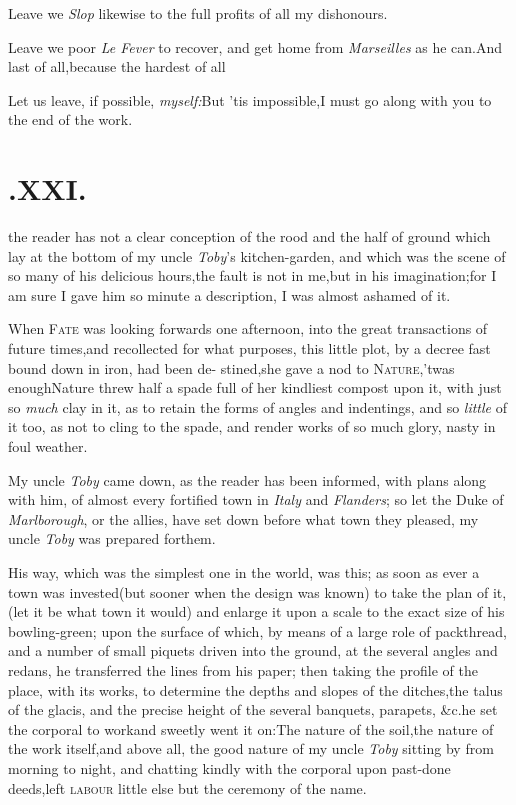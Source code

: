 \documentclass{article}
\begin{document}
Leave we \textit{Slop} likewise to the full pro\-fits of all my
dishonours.\tsh

Leave we poor \textit{Le Fever} to recover, and get home from
\textit{Marseilles} as he can.\break\tsh And last of
all,\tsk because the hardest of all\tsh{}

Let us leave, if possible, \textit{myself:}\tsh But
’tis impossible,\tsk I must go along with you to the end of
the work.

\section{.\enspace XXI.}

 the reader has not a clear
conception of the rood and the half of ground which lay at the
bottom of my uncle \textit{Toby}’s kitchen-garden, and which
was the scene of so many of his delicious hours,\tsk the fault is
not in me,\tsk but in his imagination;\tsk for I am sure I gave
him so minute a description, I was almost ashamed of it.

When \textsc{Fate} was looking forwards one afternoon,
into the great transactions of future times,\tsk and recollected
for what purposes, this little plot, by a decree fast bound down in
iron, had been de- stined,\tsk she gave a nod to
\textsc{Nature},\tsk ’twas enough\tsk Nature threw
half a spade full of her kindliest compost upon it, with just so
\textit{much} clay in it, as to retain the forms of angles and
indentings,\tsk\break
and so \textit{little} of it too, as not to cling
to the spade, and render works of so much glory, nasty in foul
weather.

My uncle \textit{Toby} came down, as the reader has been informed,
with plans along with him, of almost every fortified town in
\textit{Italy} and \textit{Flanders}; so let the Duke of
\textit{Marlborough}, or the allies, have set down before what town
they pleased, my uncle \textit{Toby} was prepared for\break them.

His way, which was the simplest one in the world, was this; as
soon as ever a town was invested\tsk (but sooner when 
the design was known) to take the plan\break
of it, (let it be what town it would)\break
and enlarge it upon a scale to the exact size of his bowling-green;
upon the surface of which, by means of a large role of packthread,
and a number of small piquets driven into the ground, at the
several angles and redans, he transferred the lines from his paper;
then taking the profile of the place, with its works, to determine
the depths and slopes of the ditches,\tsk the talus of the
glacis, and the precise height of the several banquets, parapets,
\&c.\tsk he set the corporal to work\tsh and sweetly went it
on:\tsh The nature of the soil,\tsk the nature of the
work itself,\tsk and above all, the good nature of my uncle
\textit{Toby} sitting by from morning to night, and chatting kindly
with the corporal upon past-done deeds,\tsk left
\textsc{labour} little else but the ceremony of the name.
\end{document}
